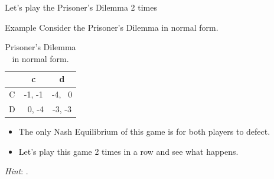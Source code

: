\documentclass[10pt, notes]{beamer}
\newcommand{\payoff}[2]{{\color{green}#1}, {\color{red}#2}}
\begin{document}
\begin{frame}{Let's play the Prisoner's Dilemma 2 times}
    \begin{exampleblock}{Example}
        Consider the Prisoner's Dilemma in normal form.
        \begin{table}
            \begin{tabular}{c|cc}
                & {\color{red}c}    & {\color{red}d} \\
                \hline
                {\color{green}C}    & \payoff{-1}{-1}   & \payoff{-4}{~0} \\
                {\color{green}D}    & \payoff{~0}{-4}    & \payoff{-3}{-3} 
            \end{tabular}
            \caption{Prisoner's Dilemma in normal form.}
        \end{table}
    
        \begin{itemize}
            \item The only Nash Equilibrium of this game is for both
            players to defect.
            \item Let's play this game 2 times in a row and see what happens.
        \end{itemize}
        
        \vspace{0.5cm}
        \hfill \textit{Hint}: .

    \end{exampleblock}
\end{frame}

\end{document}
